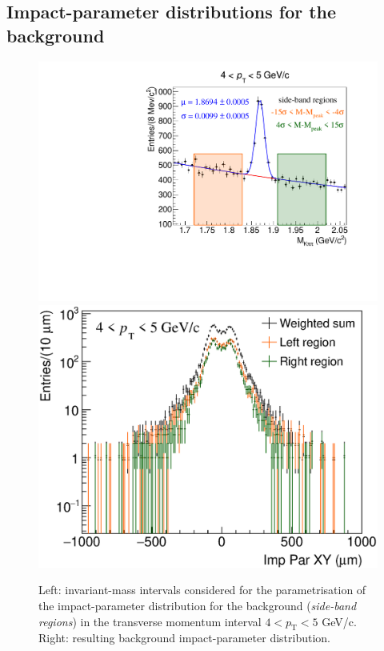 \documentclass[b5paper,10pt,twoside,oldstyle,classica]{toptesi}
\newcommand{\pt}{p_\text{T}}
\begin{document}
\subsection{Impact-parameter distributions for the background}
\label{SB_sec}
\begin{figure}[b]
\begin{center}
{\includegraphics[scale = 0.32]{Mass_4-5.pdf}}
\hspace{-0.5cm}
{\includegraphics[scale = 0.32]{Sidebands_Pt_4-5_NoFit.eps}}
\end{center}
\caption{Left: invariant-mass intervals considered for the parametrisation of the impact-parameter distribution for the background (\textit{side-band regions}) in the transverse momentum interval $4<\pt<5$ GeV/c. Right: resulting background impact-parameter distribution.}
\label{SB_region}
\end{figure}
\end{document}
